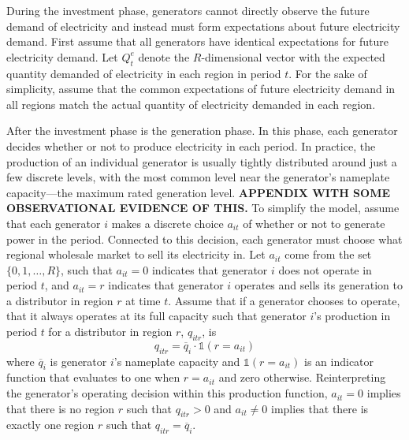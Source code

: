 During the investment phase, generators cannot directly observe the future demand of electricity and instead must form expectations about future electricity demand. First assume that all generators have identical expectations for future electricity demand. Let $Q_t^e$ denote the $R$-dimensional vector with the expected quantity demanded of electricity in each region in period $t$. For the sake of simplicity, assume that the common expectations of future electricity demand in all regions match the actual quantity of electricity demanded in each region. 

After the investment phase is the generation phase. In this phase, each generator decides whether or not to produce electricity in each period. In practice, the production of an individual generator is usually tightly distributed around just a few discrete levels, with the most common level near the generator's nameplate capacity---the maximum rated generation level. \textbf{APPENDIX WITH SOME OBSERVATIONAL EVIDENCE OF THIS.} To simplify the model, assume that each generator $i$ makes a discrete choice $a_{it}$ of whether or not to generate power in the period. Connected to this decision, each generator must choose what regional wholesale market to sell its electricity in. Let $a_{it}$ come from the set $\{0, 1, \ldots, R\}$, such that $a_{it} = 0$ indicates that generator $i$ does not operate in period $t$, and $a_{it} = r$ indicates that generator $i$ operates and sells its generation to a distributor in region $r$ at time $t$. Assume that if a generator chooses to operate, that it always operates at its full capacity such that generator $i$'s production in period $t$ for a distributor in region $r$,  $q_{itr}$, is
\begin{equation}
    q_{itr} = \overline{q}_i \cdot \mathds{1}(r = a_{it})
\end{equation}
where $\overline{q}_i$ is generator $i$'s nameplate capacity and $\mathds{1}(r = a_{it})$ is an indicator function that evaluates to one when $r = a_{it}$ and zero otherwise. Reinterpreting the generator's operating decision within this production function, $a_{it} = 0$ implies that there is no region $r$ such that $q_{itr} > 0$ and $a_{it} \neq 0$ implies that there is exactly one region $r$ such that $q_{itr} = \overline{q}_i$. 

